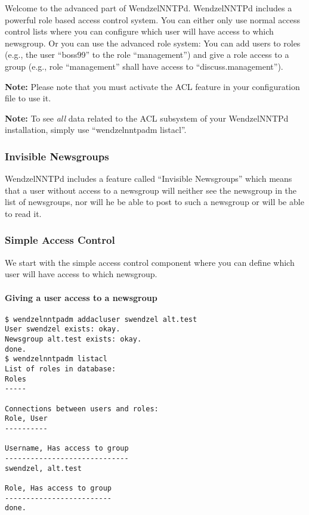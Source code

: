 \documentclass[12pt,fleqn,leqno]{scrbook}
\begin{document}
Welcome to the advanced part of WendzelNNTPd. WendzelNNTPd includes a
powerful role based access control system. You can either only use
normal access control lists where you can configure which user will have
access to which newsgroup. Or you can use the advanced role system: You
can add users to roles (e.g., the user ``boss99'' to the role
``management'') and give a role access to a group (e.g., role
``management'' shall have access to ``discuss.management'').

\textbf{Note:} Please note that you must activate the ACL feature in
your configuration file to use it.

\textbf{Note:} To see \emph{all} data related to the ACL subsystem of
your WendzelNNTPd installation, simply use ``wendzelnntpadm listacl''.

\hypertarget{invisible-newsgroups}{%
\subsubsection{Invisible Newsgroups}\label{invisible-newsgroups}}

WendzelNNTPd includes a feature called ``Invisible Newsgroups'' which
means that a user without access to a newsgroup will neither see the
newsgroup in the list of newsgroups, nor will he be able to post to such
a newsgroup or will be able to read it.

\hypertarget{simple-access-control}{%
\subsubsection{Simple Access Control}\label{simple-access-control}}

We start with the simple access control component where you can define
which user will have access to which newsgroup.

\hypertarget{giving-a-user-access-to-a-newsgroup}{%
\paragraph{Giving a user access to a
newsgroup}\label{giving-a-user-access-to-a-newsgroup}}

\begin{verbatim}
$ wendzelnntpadm addacluser swendzel alt.test
User swendzel exists: okay.
Newsgroup alt.test exists: okay.
done.
$ wendzelnntpadm listacl
List of roles in database:
Roles
-----

Connections between users and roles:
Role, User
----------

Username, Has access to group
-----------------------------
swendzel, alt.test

Role, Has access to group
-------------------------
done.
\end{verbatim}
\end{document}
